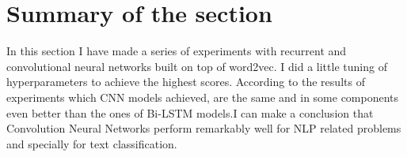 \section{Summary of the section} \label{sect4_6}

In this section I have made a series of
experiments with recurrent and convolutional neural networks
built on top of word2vec. I did a little tuning
of hyperparameters to achieve the highest scores. 
According to the results of experiments which CNN models achieved, are the same and in some components even better than the ones of Bi-LSTM models.I can make a conclusion that Convolution Neural Networks perform remarkably well for NLP related problems and specially for text classification. 


